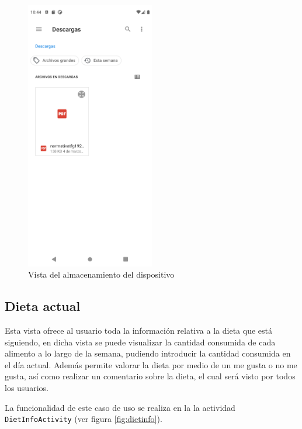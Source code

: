 \begin{figure}[H]
    \centering
    \includegraphics[width=0.5\textwidth]{Images/Capitulo7/archivos.png}
        \caption{Vista del almacenamiento del dispositivo}
    \label{fig:archivos}
\end{figure}

\subsection{Dieta actual}
Esta vista ofrece al usuario toda la información relativa a la dieta que está siguiendo, en dicha vista se puede visualizar la cantidad consumida de cada alimento a lo largo de la semana, pudiendo introducir la cantidad consumida en el día actual. Además permite valorar la dieta por medio de un me gusta o no me gusta, así como realizar un comentario sobre la dieta, el cual será visto por todos los usuarios.

La funcionalidad de este caso de uso se realiza en la la actividad \texttt{DietInfoActivity} (ver figura \ref{fig:dietinfo}).

